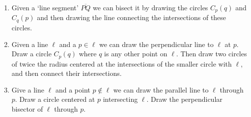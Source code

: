 \begin{enumerate}
\item Given a `line segment' $\overline{PQ}$ we can bisect it by drawing the circles $C_p(q)$ and $C_q(p)$ and then drawing the line connecting the intersections of these circles.

\item Given a line $\ell$ and a $p \in \ell$ we can draw the perpendicular line to $\ell$ at $p$. Draw a circle $C_p(q)$ where $q$ is any other point on $\ell$. Then draw two circles of twice the radius centered at the intersections of the smaller circle with $\ell$, and then connect their intersections.

\item Give a line $\ell$ and a point $p \notin \ell$ we can draw the parallel line to $\ell$ through $p$. Draw a circle centered at $p$ intersecting $\ell$. Draw the perpendicular bisector of $\ell$ through $p$.
\end{enumerate}